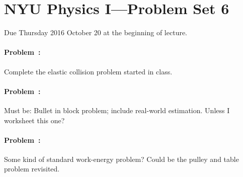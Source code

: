 \documentclass[12pt]{article}
\begin{document}
\section*{NYU Physics I---Problem Set 6}

Due Thursday 2016 October 20 at the beginning of lecture.

\paragraph{Problem~\theproblem:}%
Complete the elastic collision problem started in class.

\paragraph{Problem~\theproblem:}%
Must be: Bullet in block problem; include real-world estimation. Unless I worksheet this one?

\paragraph{Problem~\theproblem:}%
Some kind of standard work-energy problem? Could be the pulley and table problem revisited.
\end{document}
